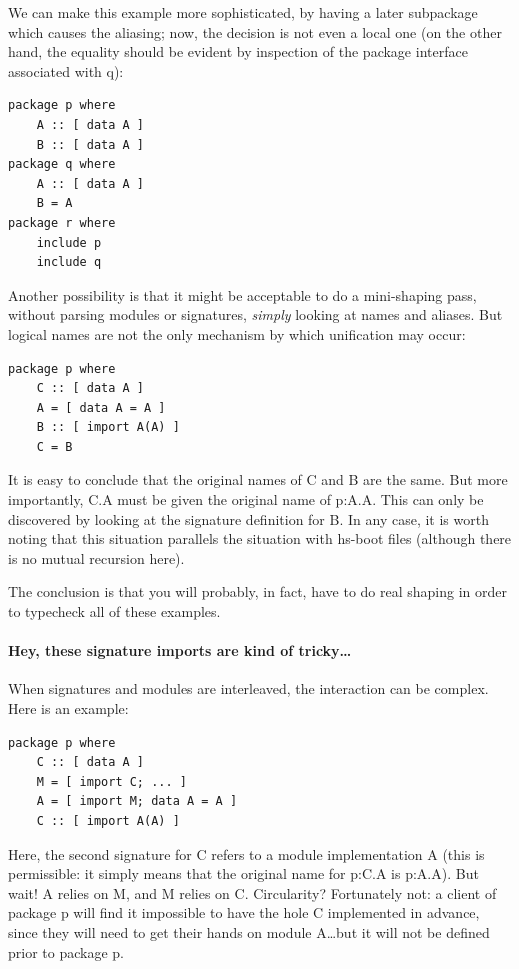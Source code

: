 \documentclass{article}
\begin{document}
We can make this example more sophisticated, by having a later
subpackage which causes the aliasing; now, the decision is not even a
local one (on the other hand, the equality should be evident by inspection
of the package interface associated with q):

\begin{verbatim}
package p where
    A :: [ data A ]
    B :: [ data A ]
package q where
    A :: [ data A ]
    B = A
package r where
    include p
    include q
\end{verbatim}

Another possibility is that it might be acceptable to do a mini-shaping
pass, without parsing modules or signatures, \emph{simply} looking at
names and aliases.  But logical names are not the only mechanism by
which unification may occur:

\begin{verbatim}
package p where
    C :: [ data A ]
    A = [ data A = A ]
    B :: [ import A(A) ]
    C = B
\end{verbatim}

It is easy to conclude that the original names of C and B are the same.  But
more importantly, C.A must be given the original name of p:A.A.  This can only
be discovered by looking at the signature definition for B. In any case, it
is worth noting that this situation parallels the situation with hs-boot
files (although there is no mutual recursion here).

The conclusion is that you will probably, in fact, have to do real
shaping in order to typecheck all of these examples.

\paragraph{Hey, these signature imports are kind of tricky\ldots}

When signatures and modules are interleaved, the interaction can be
complex.  Here is an example:

\begin{verbatim}
package p where
    C :: [ data A ]
    M = [ import C; ... ]
    A = [ import M; data A = A ]
    C :: [ import A(A) ]
\end{verbatim}

Here, the second signature for C refers to a module implementation A
(this is permissible: it simply means that the original name for p:C.A
is p:A.A).  But wait! A relies on M, and M relies on C. Circularity?
Fortunately not: a client of package p will find it impossible to have
the hole C implemented in advance, since they will need to get their hands on module
A\ldots but it will not be defined prior to package p.
\end{document}
